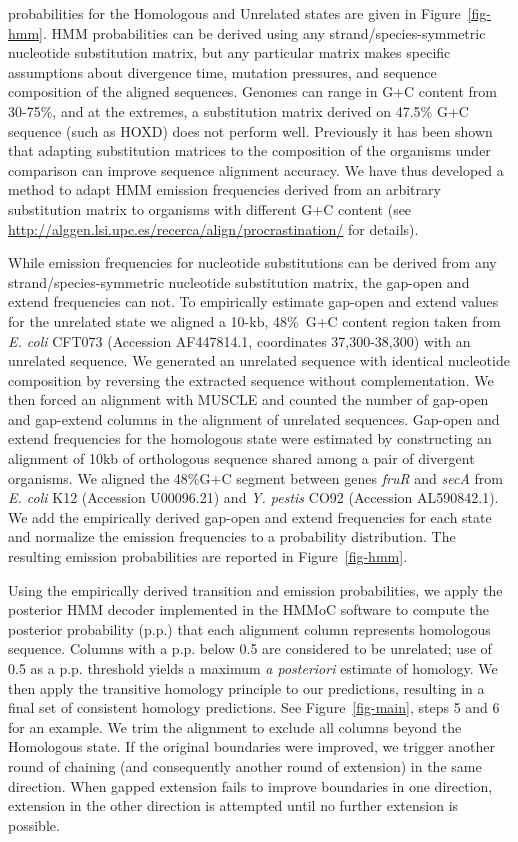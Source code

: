 \documentclass{llncs}
\begin{document}
probabilities for the Homologous and Unrelated states are given
in Figure~\ref{fig-hmm}. HMM probabilities can be derived using any strand/species-symmetric nucleotide substitution matrix,
but any particular matrix makes specific assumptions about divergence time, mutation pressures,
and sequence composition of the aligned sequences.
Genomes can range in G+C content from 30-75\%, and at the extremes,
a substitution matrix derived on 47.5\% G+C sequence (such as HOXD) does not
perform well. Previously it has been shown that adapting substitution matrices to the composition
of the organisms under comparison can improve sequence alignment accuracy\cite{ref-rev3b}.  We have thus developed a method to adapt HMM emission
frequencies derived from an arbitrary substitution matrix
to organisms with different G+C content (see \url{http://alggen.lsi.upc.es/recerca/align/procrastination/} for details).

While emission frequencies for nucleotide substitutions can be derived from
any strand/species-symmetric nucleotide substitution matrix, the gap-open
and extend frequencies can not.  To empirically estimate gap-open and extend values
for the unrelated state we aligned a 10-kb, 48\%~G+C content region
taken from \emph{E. coli} CFT073 (Accession AF447814.1, coordinates
37,300-38,300) with an unrelated sequence.  We generated an unrelated
sequence with identical nucleotide composition by reversing the
extracted sequence without complementation.  We then forced an
alignment with MUSCLE and counted the number of gap-open and gap-extend
columns in the alignment of unrelated sequences.  Gap-open and
extend frequencies for the homologous state were estimated by
constructing an alignment of 10kb of orthologous sequence shared among
a pair of divergent organisms.  We aligned the 48\%G+C segment between
genes \textit{fruR} and \textit{secA} from \textit{E. coli} K12
(Accession U00096.21) and \emph{Y. pestis} CO92 (Accession
AL590842.1). We add the empirically derived gap-open and extend
frequencies for each state and normalize the emission frequencies to a
probability distribution.  The resulting emission probabilities are
reported in Figure~\ref{fig-hmm}.

Using the empirically derived transition and emission probabilities,
we apply the posterior HMM decoder implemented in the HMMoC software\cite{Lunter2007} to compute the posterior probability (p.p.) that
each alignment column represents homologous sequence.  Columns with a
p.p. below 0.5 are considered to be unrelated; use of 0.5 as a p.p. threshold
yields a maximum \textit{a posteriori} estimate of homology.  We then apply the
transitive homology principle to our predictions, resulting in a final
set of consistent homology predictions.  See Figure~\ref{fig-main},
steps 5 and 6 for an example. We trim the alignment to exclude all
columns beyond the Homologous state. If the original boundaries were
improved, we trigger another round of chaining (and consequently
another round of extension) in the same direction.
When gapped extension fails to improve boundaries
in one direction, extension in the other direction is attempted until
no further extension is possible.
\end{document}
